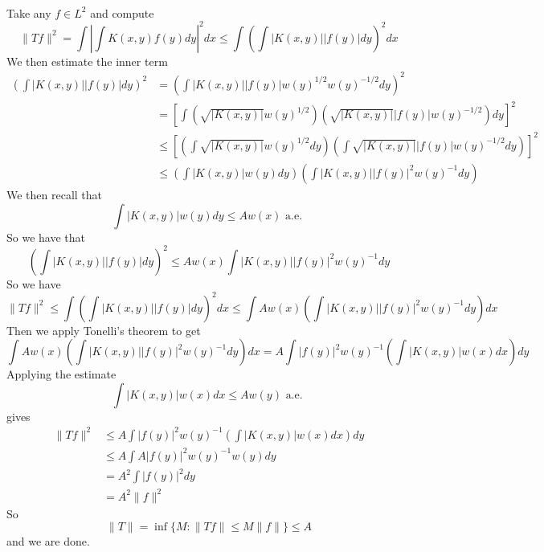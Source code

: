 \documentclass{article}
\newcommand{\problem}[1]{\noindent{\textbf{Problem #1}}\\}
\newcommand{\norm}[1]{\|#1\|}
\begin{document}
\problem{4.27.26} Take any $f \in L^2$ and compute 
\[
\norm{Tf}^2 = \int\left|\int K(x,y)f(y)dy\right|^2dx \leq \int\left(\int|K(x,y)||f(y)|dy\right)^2dx
\] 
We then estimate the inner term
\begin{align*}
\left(\int|K(x,y)||f(y)|dy\right)^2 &= \left(\int|K(x,y)||f(y)|w(y)^{1/2}w(y)^{-1/2}dy\right)^2 \\
&= \left[\int\left(\sqrt{|K(x,y)|}w(y)^{1/2}\right)\left(\sqrt{|K(x,y)|}|f(y)|w(y)^{-1/2}\right)dy\right]^2 \\
&\leq \left[\left(\int \sqrt{|K(x,y)|}w(y)^{1/2}dy\right)\left(\int\sqrt{|K(x,y)|}|f(y)|w(y)^{-1/2}dy\right)\right]^2 \\
&\leq \left(\int |K(x,y)|w(y)dy\right) \left(\int |K(x,y)||f(y)|^2w(y)^{-1}dy\right)   
\end{align*}
We then recall that 
\[
\int|K(x,y)|w(y)dy \leq Aw(x) \text{ a.e. }
\]
So we have that 
\[
\left(\int|K(x,y)||f(y)|dy\right)^2 \leq Aw(x)\int |K(x,y)||f(y)|^2w(y)^{-1}dy
\]
So we have 
\[
\norm{Tf}^2 \leq \int\left(\int|K(x,y)||f(y)|dy\right)^2dx \leq \int Aw(x)\left(\int |K(x,y)||f(y)|^2w(y)^{-1}dy\right)dx
\]
Then we apply Tonelli's theorem to get 
\[
\int Aw(x)\left(\int |K(x,y)||f(y)|^2w(y)^{-1}dy\right)dx = A\int |f(y)|^2w(y)^{-1}\left(\int|K(x,y)|w(x)dx\right)dy
\]
Applying the estimate
\[
\int|K(x,y)|w(x)dx \leq Aw(y) \text{ a.e. }
\]
gives
\begin{align*}
\norm{Tf}^2 &\leq A\int |f(y)|^2w(y)^{-1}\left(\int|K(x,y)|w(x)dx\right)dy \\
&\leq A\int A|f(y)|^2w(y)^{-1}w(y)dy \\
&= A^2 \int |f(y)|^2dy \\
&= A^2\norm{f}^2
\end{align*}
So 
\[
\norm{T} = \inf \{M \mathrel{:} \norm{Tf} \leq M\norm{f}\} \leq A
\]
and we are done.
\end{document}
